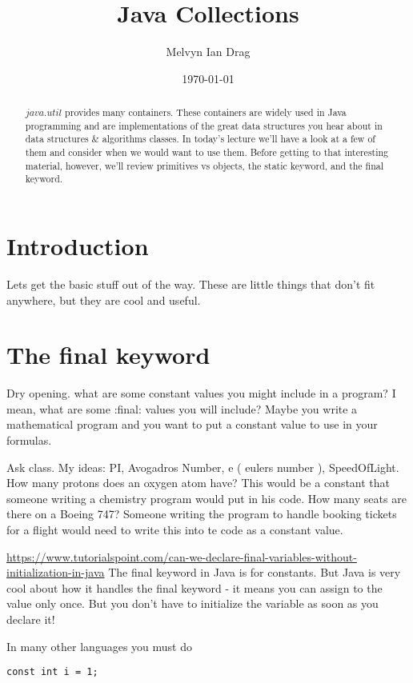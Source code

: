 \documentclass[12pt]{article}
\title{Java Collections}
\author{
	Melvyn Ian Drag
}
\date{\today}
\begin{document}
\maketitle

\begin{abstract}
$java.util$ provides many containers. These containers are widely used in Java
programming and are implementations of the great data structures you hear about
in data structures \& algorithms classes. In today's lecture we'll have a look
at a few of them and consider when we would want to use them. Before getting to
that interesting material, however, we'll review primitives vs objects, the
static keyword, and the final keyword.
\end{abstract}

\section{Introduction}
Lets get the basic stuff out of the way. These are little things that don't fit
anywhere, but they are cool and useful.

\section{The final keyword}
Dry opening.
what are some constant values you might include in a program?
I mean, what are some :final: values you will include? Maybe you write a
mathematical program and you want to put a constant value to use in your
formulas.

Ask class.
My ideas:
PI, Avogadros Number, e ( eulers number ), SpeedOfLight.
How many protons does an oxygen atom have? This would be a constant that someone
writing a chemistry program would put in his code.
How many seats are there on a Boeing 747? Someone writing the program to handle
booking tickets for a flight would need to write this into te code as a constant
value.



\url{https://www.tutorialspoint.com/can-we-declare-final-variables-without-initialization-in-java}
The final keyword in Java is for constants. But Java is very cool about how it
handles the final keyword - it means you can assign to the value only once. But
you don't have to initialize the variable as soon as you declare it! 

In many other languages you must do
\begin{lstlisting}
const int i = 1;
\end{lstlisting}
\end{document}
